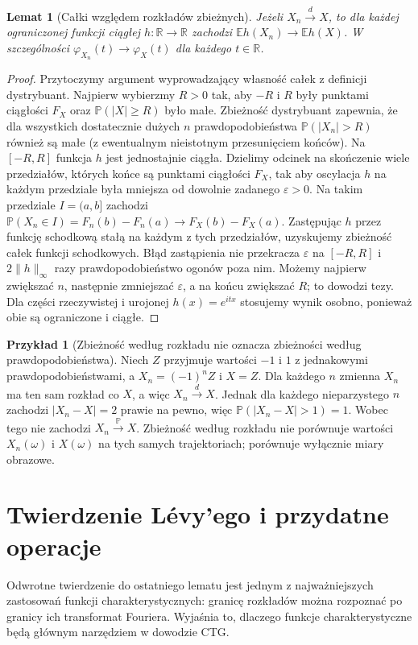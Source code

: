 \documentclass[11pt,a4paper,oneside]{report}
\numberwithin{equation}{chapter}
\theoremstyle{plain}
\newtheorem{lemat}[twierdzenie]{Lemat}
\theoremstyle{definition}
\newtheorem{przyklad}{Przykład}[chapter]
\theoremstyle{remark}
\newcommand{\R}{\mathbb{R}}
\newcommand{\Prob}{\mathbb{P}}
\newcommand{\E}{\mathbb{E}}
\begin{document}
\begin{lemat}[Całki względem rozkładów zbieżnych]
Jeżeli $X_n\xrightarrow{d}X$, to dla każdej ograniczonej
funkcji ciągłej $h:\R\to\R$ zachodzi
$\E h(X_n)\to\E h(X)$.
W szczególności $\varphi_{X_n}(t)\to\varphi_X(t)$
dla każdego $t\in\R$.
\end{lemat}
\begin{proof}
Przytoczymy argument wyprowadzający własność całek
z definicji dystrybuant. Najpierw wybierzmy $R>0$ tak,
aby $-R$ i $R$ były punktami ciągłości $F_X$ oraz
$\Prob(|X|\geq R)$ było małe. Zbieżność dystrybuant
zapewnia, że dla wszystkich dostatecznie dużych $n$
prawdopodobieństwa $\Prob(|X_n|>R)$ również są małe
(z ewentualnym nieistotnym przesunięciem końców).
Na $[-R,R]$ funkcja $h$ jest jednostajnie ciągła.
Dzielimy odcinek na skończenie wiele przedziałów,
których końce są punktami ciągłości $F_X$, tak aby
oscylacja $h$ na każdym przedziale była mniejsza
od dowolnie zadanego $\varepsilon>0$.
Na takim przedziale $I=(a,b]$ zachodzi
$\Prob(X_n\in I)=F_n(b)-F_n(a)\to F_X(b)-F_X(a)$.
Zastępując $h$ przez funkcję schodkową stałą na
każdym z tych przedziałów, uzyskujemy zbieżność
całek funkcji schodkowych. Błąd zastąpienia nie
przekracza $\varepsilon$ na $[-R,R]$ i
$2\|h\|_\infty$ razy prawdopodobieństwo ogonów
poza nim. Możemy najpierw zwiększać $n$, następnie
zmniejszać $\varepsilon$, a na końcu zwiększać $R$;
to dowodzi tezy. Dla części rzeczywistej i urojonej
$h(x)=e^{itx}$ stosujemy wynik osobno, ponieważ
obie są ograniczone i ciągłe.
\end{proof}


\begin{przyklad}[Zbieżność według rozkładu nie oznacza zbieżności według prawdopodobieństwa]
Niech $Z$ przyjmuje wartości $-1$ i $1$ z jednakowymi
prawdopodobieństwami, a $X_n=(-1)^nZ$ i $X=Z$.
Dla każdego $n$ zmienna $X_n$ ma ten sam rozkład co $X$,
a więc $X_n\xrightarrow{d}X$. Jednak dla każdego
nieparzystego $n$ zachodzi $|X_n-X|=2$ prawie na pewno,
więc $\Prob(|X_n-X|>1)=1$.
Wobec tego nie zachodzi $X_n\xrightarrow{\Prob}X$.
Zbieżność według rozkładu nie porównuje wartości
$X_n(\omega)$ i $X(\omega)$ na tych samych trajektoriach;
porównuje wyłącznie miary obrazowe.
\end{przyklad}

\section{Twierdzenie Lévy'ego i przydatne operacje}

Odwrotne twierdzenie do ostatniego lematu jest jednym
z najważniejszych zastosowań funkcji charakterystycznych:
granicę rozkładów można rozpoznać po granicy ich
transformat Fouriera. Wyjaśnia to, dlaczego funkcje
charakterystyczne będą głównym narzędziem w dowodzie CTG.
\end{document}
